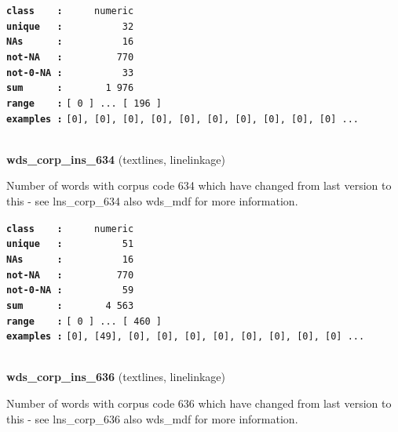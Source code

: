 \documentclass[]{article}
\begin{document}
\textbf{\texttt{class\ \ \ \ :}} \texttt{~~~~~numeric}\\
\textbf{\texttt{unique\ \ \ :}} \texttt{~~~~~~~~~~32}\\
\textbf{\texttt{NAs\ \ \ \ \ \ :}} \texttt{~~~~~~~~~~16}\\
\textbf{\texttt{not-NA\ \ \ :}} \texttt{~~~~~~~~~770}\\
\textbf{\texttt{not-0-NA\ :}} \texttt{~~~~~~~~~~33}\\
\textbf{\texttt{sum\ \ \ \ \ \ :}} \texttt{~~~~~~~1~976}\\
\textbf{\texttt{range\ \ \ \ :}}
\texttt{{[}\ 0\ {]}\ ...\ {[}\ 196\ {]}}\\
\textbf{\texttt{examples\ :}}
\texttt{{[}0{]},\ {[}0{]},\ {[}0{]},\ {[}0{]},\ {[}0{]},\ {[}0{]},\ {[}0{]},\ {[}0{]},\ {[}0{]},\ {[}0{]}\ ...}\\

~

\textbf{wds\_corp\_ins\_634} (textlines, linelinkage)

Number of words with corpus code 634 which have changed from last
version to this - see lns\_corp\_634 also wds\_mdf for more information.

\textbf{\texttt{class\ \ \ \ :}} \texttt{~~~~~numeric}\\
\textbf{\texttt{unique\ \ \ :}} \texttt{~~~~~~~~~~51}\\
\textbf{\texttt{NAs\ \ \ \ \ \ :}} \texttt{~~~~~~~~~~16}\\
\textbf{\texttt{not-NA\ \ \ :}} \texttt{~~~~~~~~~770}\\
\textbf{\texttt{not-0-NA\ :}} \texttt{~~~~~~~~~~59}\\
\textbf{\texttt{sum\ \ \ \ \ \ :}} \texttt{~~~~~~~4~563}\\
\textbf{\texttt{range\ \ \ \ :}}
\texttt{{[}\ 0\ {]}\ ...\ {[}\ 460\ {]}}\\
\textbf{\texttt{examples\ :}}
\texttt{{[}0{]},\ {[}49{]},\ {[}0{]},\ {[}0{]},\ {[}0{]},\ {[}0{]},\ {[}0{]},\ {[}0{]},\ {[}0{]},\ {[}0{]}\ ...}\\

~

\textbf{wds\_corp\_ins\_636} (textlines, linelinkage)

Number of words with corpus code 636 which have changed from last
version to this - see lns\_corp\_636 also wds\_mdf for more information.
\end{document}
